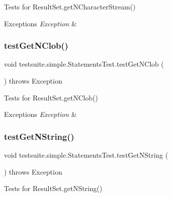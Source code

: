 Tests for Result\+Set.\+get\+N\+Character\+Stream()


\begin{DoxyExceptions}{Exceptions}
{\em Exception} & \\
\hline
\end{DoxyExceptions}
\mbox{\label{classtestsuite_1_1simple_1_1_statements_test_a536b53923bd42d63d56f1105e13def2a}} 
\subsubsection{\texorpdfstring{test\+Get\+N\+Clob()}{testGetNClob()}}
{\footnotesize\ttfamily void testsuite.\+simple.\+Statements\+Test.\+test\+Get\+N\+Clob (\begin{DoxyParamCaption}{ }\end{DoxyParamCaption}) throws Exception}

Tests for Result\+Set.\+get\+N\+Clob()


\begin{DoxyExceptions}{Exceptions}
{\em Exception} & \\
\hline
\end{DoxyExceptions}
\mbox{\label{classtestsuite_1_1simple_1_1_statements_test_a3901a8c1dff89f3d0ef056153855d1ed}} 
\subsubsection{\texorpdfstring{test\+Get\+N\+String()}{testGetNString()}}
{\footnotesize\ttfamily void testsuite.\+simple.\+Statements\+Test.\+test\+Get\+N\+String (\begin{DoxyParamCaption}{ }\end{DoxyParamCaption}) throws Exception}

Tests for Result\+Set.\+get\+N\+String()



